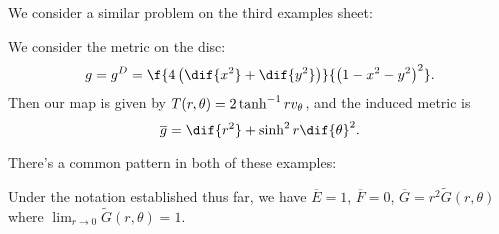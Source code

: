 We consider a similar problem on the third examples sheet:

\begin{example}
	We consider the metric on the disc:
	\begin{equation*}
		g = g^D = \f{4\left( \dif{x^2}+\dif{y^2} \right)}{\left( 1-x^2-y^2 \right)^2}.
	\end{equation*}
	Then our map is given by $T(r,\theta) = 2\tanh^{-1} r v_\theta$, and the induced metric is
	\begin{equation*}
		\overline{g} = \dif{r^2} + \sinh^2 r \dif{\theta}^2.
	\end{equation*}
\end{example}

There's a common pattern in both of these examples:

\vspace{3pt}

\begin{proposition}
	Under the notation established thus far, we have $\overline{E}=1$, $\overline{F}=0$, $\overline{G} = r^2 \tilde{G}(r,\theta)$ where $\lim_{r\to 0} \tilde{G}(r,\theta) = 1$.
\end{proposition}

